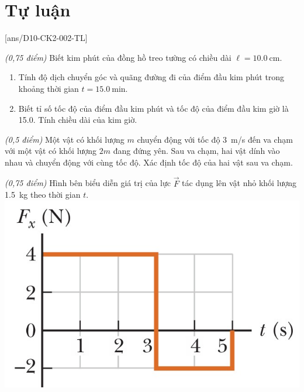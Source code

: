 \section{Tự luận} 
\setcounter{ex}{0}
[ans/D10-CK2-002-TL]
\begin{ex}\textit{(0,75 điểm)}
	Biết kim phút của đồng hồ treo tường có chiều dài $\ell=\SI{10.0}{\centi\meter}$.
	\begin{enumerate}[label=\alph*)]
		\item Tính độ dịch chuyển góc và quãng đường đi của điểm đầu kim phút trong khoảng thời gian $t=\SI{15.0}{\minute}$.
		\item Biết tỉ số tốc độ của điểm đầu kim phút và tốc độ của điểm đầu kim giờ là \SI{15.0}{}. Tính chiều dài của kim giờ.
	\end{enumerate}
	\loigiai{
		
	}
\end{ex}
\begin{ex}\textit{(0,5 điểm)}
	Một vật có khối lượng $m$ chuyển động với tốc độ \SI{3}{\meter/\second} đến va chạm với một vật có khối lượng $2m$ đang đứng yên. Sau va chạm, hai vật dính vào nhau và chuyển động với cùng tốc độ. Xác định tốc độ của hai vật sau va chạm.
	\loigiai{
		
	}
\end{ex}
\begin{ex}\textit{(0,75 điểm)}
	Hình bên biểu diễn giá trị của lực $\vec{F}$ tác dụng lên vật nhỏ khối lượng \SI{1.5}{\kilogram} theo thời gian $t$.
{\vspace{-0.5cm}\includegraphics[scale=0.4]{../figs/D10-CK2-002-4}}
	\loigiai{
		
	}
\end{ex}
